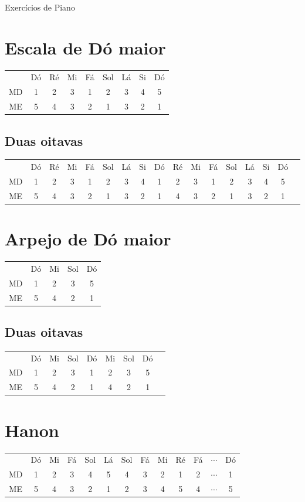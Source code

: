 \documentclass{article}
\begin{document}
\centerline{\huge Exercícios de Piano}

\section*{Escala de Dó maior}
\begin{tabular}{c c c c c c c c c}
    & Dó & Ré & Mi & Fá & Sol & Lá & Si & Dó \\
    MD & 1 & 2 & 3 & 1 & 2 & 3 & 4 & 5 \\ 
    ME & 5 & 4 & 3 & 2 & 1 & 3 & 2 & 1
\end{tabular}

\subsection*{Duas oitavas}
\begin{tabular}{c c c c c c c c c c c c c c c c c}
    & Dó & Ré & Mi & Fá & Sol & Lá & Si & Dó & Ré & Mi & Fá & Sol & Lá & Si & Dó \\
 MD & 1 & 2 & 3 & 1 & 2 & 3 & 4 & 1 & 2 & 3 & 1 & 2 & 3 & 4 & 5 \\ 
 ME & 5 & 4 & 3 & 2 & 1 & 3 & 2 & 1 & 4 & 3 & 2 & 1 & 3 & 2 & 1 
\end{tabular}

\section*{Arpejo de Dó maior}
\begin{tabular}{c c c c c}
    & Dó & Mi & Sol & Dó \\
 MD & 1 & 2 & 3 & 5 \\ 
 ME & 5 & 4 & 2 & 1
\end{tabular}

\subsection*{Duas oitavas}
\begin{tabular}{c c c c c c c c c}
    & Dó & Mi & Sol & Dó & Mi & Sol & Dó\\
 MD & 1 & 2 & 3 & 1 & 2 & 3 & 5 \\ 
 ME & 5 & 4 & 2 & 1 & 4 & 2 & 1
\end{tabular}

\section*{Hanon}
\begin{tabular}{c c c c c c c c c c c c c}
    & Dó & Mi & Fá & Sol & Lá & Sol & Fá & Mi & Ré & Fá & $\cdots$ & Dó \\
 MD & 1 & 2 & 3 & 4 & 5 & 4 & 3 & 2 & 1 & 2 & $\cdots$ & 1 \\ 
 ME & 5 & 4 & 3 & 2 & 1 & 2 & 3 & 4 & 5 & 4 & $\cdots$ & 5
\end{tabular}
\end{document}

